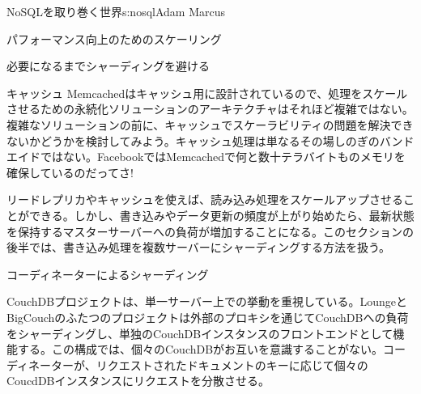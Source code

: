 \begin{aosachapter}{NoSQLを取り巻く世界}{s:nosql}{Adam Marcus}
\begin{aosasect1}{パフォーマンス向上のためのスケーリング}
\begin{aosasect2}{必要になるまでシャーディングを避ける}
\begin{aosasect3}{キャッシュ}
Memcachedはキャッシュ用に設計されているので、処理をスケールさせるための永続化ソリューションのアーキテクチャはそれほど複雑ではない。複雑なソリューションの前に、キャッシュでスケーラビリティの問題を解決できないかどうかを検討してみよう。キャッシュ処理は単なるその場しのぎのバンドエイドではない。FacebookではMemcachedで何と数十テラバイトものメモリを確保しているのだってさ!

\end{aosasect3}

リードレプリカやキャッシュを使えば、読み込み処理をスケールアップさせることができる。しかし、書き込みやデータ更新の頻度が上がり始めたら、最新状態を保持するマスターサーバーへの負荷が増加することになる。このセクションの後半では、書き込み処理を複数サーバーにシャーディングする方法を扱う。

\end{aosasect2}

\begin{aosasect2}{コーディネーターによるシャーディング}

CouchDBプロジェクトは、単一サーバー上での挙動を重視している。LoungeとBigCouchのふたつのプロジェクトは外部のプロキシを通じてCouchDBへの負荷をシャーディングし、単独のCouchDBインスタンスのフロントエンドとして機能する。この構成では、個々のCouchDBがお互いを意識することがない。コーディネーターが、リクエストされたドキュメントのキーに応じて個々のCoucdDBインスタンスにリクエストを分散させる。


\end{aosasect2}
\end{aosasect1}
\end{aosachapter}
